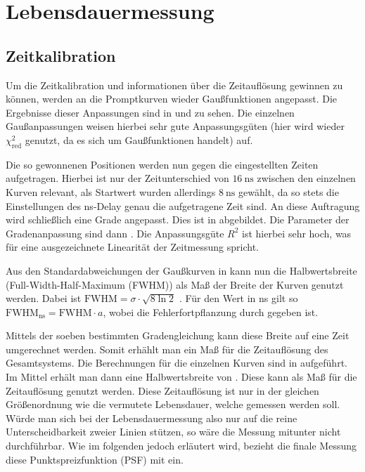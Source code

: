 \chapter{Lebensdauermessung}

\section{Zeitkalibration}
Um die Zeitkalibration und informationen über die Zeitauflösung gewinnen zu können, werden an die Promptkurven wieder Gaußfunktionen angepasst. Die Ergebnisse dieser Anpassungen sind in  und  zu sehen. Die einzelnen Gaußanpassungen weisen hierbei sehr gute Anpassungsgüten (hier wird wieder $\chi^2_\text{red}$ genutzt, da es sich um Gaußfunktionen handelt) auf.


Die so gewonnenen Positionen werden nun gegen die eingestellten Zeiten aufgetragen. Hierbei ist nur der Zeitunterschied von $\SI{16}{\nano\second}$ zwischen den einzelnen Kurven relevant, als Startwert wurden allerdings $\SI{8}{\nano\second}$ gewählt, da so stets die Einstellungen des ns-Delay genau die aufgetragene Zeit sind. An diese Auftragung wird schließlich eine Grade angepasst. Dies ist in  abgebildet. Die Parameter der Gradenanpassung sind dann . Die Anpassungsgüte $R^2$ ist hierbei sehr hoch, was für eine ausgezeichnete Linearität der Zeitmessung spricht.

Aus den Standardabweichungen der Gaußkurven in  kann nun die Halbwertsbreite (Full-Width-Half-Maximum (FWHM)) als Maß der Breite der Kurven genutzt werden. Dabei ist $\text{FWHM} = \sigma \cdot \sqrt{8 \ln{2}}$ \cite[8]{ex_techniques}. Für den Wert in ns gilt so $\text{FWHM}_\text{ns} = \text{FWHM} \cdot a$, wobei die Fehlerfortpflanzung durch  gegeben ist.

Mittels der soeben bestimmten Gradengleichung kann diese Breite auf eine Zeit umgerechnet werden. Somit erhählt man ein Maß für die Zeitauflösung des Gesamtsystems. Die Berechnungen für die einzelnen Kurven sind in  aufgeführt. Im Mittel erhält man dann eine Halbwertsbreite von . Diese kann als Maß für die Zeitauflösung genutzt werden. Diese Zeitauflösung ist nur in der gleichen Größenordnung wie die vermutete Lebensdauer, welche gemessen werden soll. Würde man sich bei der Lebensdauermessung also nur auf die reine Unterscheidbarkeit zweier Linien stützen, so wäre die Messung mitunter nicht durchführbar. Wie im folgenden jedoch erläutert wird, bezieht die finale Messung diese Punktspreizfunktion (PSF) mit ein.


